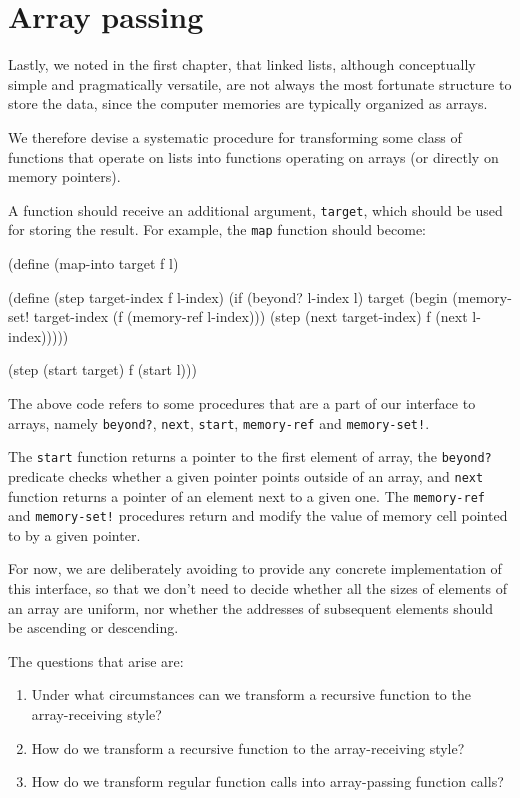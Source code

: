 \section{Array passing}

Lastly, we noted in the first chapter, that linked lists, although
conceptually simple and pragmatically versatile, are not always the
most fortunate structure to store the data, since the computer
memories are typically organized as arrays.

We therefore devise a systematic procedure for transforming some class
of functions that operate on lists into functions operating on
arrays (or directly on memory pointers).

A function should receive an additional argument, \texttt{target},
which should be used for storing the result. For example, the
\texttt{map} function should become:

\begin{Snippet}
  (define (map-into target f l)
  
    (define (step target-index f l-index)
      (if (beyond? l-index l)
        target
        (begin
          (memory-set! target-index (f (memory-ref l-index)))
          (step (next target-index) f (next l-index)))))
        
    (step (start target) f (start l)))
\end{Snippet}

The above code refers to some procedures that are a part of our interface
to arrays, namely \texttt{beyond?}, \texttt{next}, \texttt{start},
\texttt{memory-ref} and \texttt{memory-set!}.

The \texttt{start} function returns a pointer to the first element of array,
the \texttt{beyond?}\, predicate checks whether a given pointer points outside
of an array, and \texttt{next} function returns a pointer of an element next
to a given one. The \texttt{memory-ref} and \texttt{memory-set!} procedures
return and modify the value of memory cell pointed to by a given pointer.

For now, we are deliberately avoiding to provide any concrete implementation
of this interface, so that we don't need to decide whether all the sizes of
elements of an array are uniform, nor whether the addresses of subsequent
elements should be ascending or descending.

The questions that arise are:
\begin{enumerate}
\item Under what circumstances can we transform a recursive function
  to the array-receiving style?
\item How do we transform a recursive function to the array-receiving
  style?
\item How do we transform regular function calls into array-passing
  function calls?
\end{enumerate}

